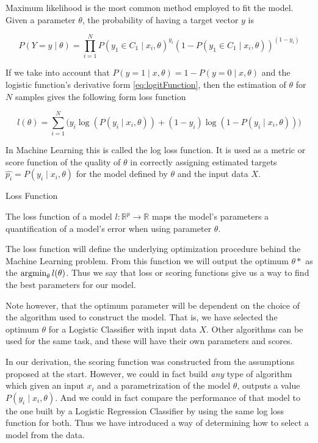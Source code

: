 Maximum likelihood is the most common method employed to fit the model. %
Given a parameter $\theta$, the probability of having a target vector $y$ is

\begin{equation}
P(Y =y \mid \theta ) = \prod_{i=1}^N {P(y_1 \in C_1 \mid x_i, \theta)}^{y_i} {(1 - P(y_1 \in C_1 \mid x_i, \theta) )}^{(1-y_i)}
\end{equation}

If we take into account that $P(y=1 \mid x,\theta) = 1 - P(y=0 \mid x,\theta)$ and the logistic function's derivative form \cref{eq:logitFunction}, then the estimation of $\theta$ for $N$ samples gives the following form
loss function

\begin{equation}\label{eq:logLossFunction}
l(\theta) = \sum_{i=1}^N \big(y_i \log(P(y_i \mid x_i,\theta)) + (1-y_i)\log(1 - P(y_i \mid x_i,\theta) ) \big)
\end{equation}

In Machine Learning this is called the log loss function. It is used as a metric or score function of the quality of $\theta$ in correctly assigning estimated targets $ {\hat{p_i}} = P(y_i \mid x_i,\theta)$ for the model defined by $\theta$ and the input data $X$.

\begin{definition}{Loss Function}

The loss function of a model $l: \mathbb{R}^{ p} \rightarrow  \mathbb{R} $ maps the model's parameters a quantification of a model's error when using parameter $\theta$.
\end{definition}

The loss function will define the underlying optimization procedure behind the Machine Learning problem. From this function we will output the optimum $\theta*$ as the $\operatorname*{argmin}_{\theta} l(\theta) $. Thus we say that loss or scoring functions give us a way to find the best parameters for our model.

Note however, that the optimum parameter will be dependent on the choice of the algorithm used to construct the model. That is, we have selected the optimum $\theta$ for a Logistic Classifier with input data $X$. Other algorithms can be used for the same task, and these will have their own parameters and scores.

In our derivation, the scoring function was constructed from the assumptions proposed at the start. However, we could in fact build \textit{any} type of algorithm which given an input $x_i$ and a parametrization of the model $\theta$, outputs a value $P(y_i \mid x_i,\theta)$. And we could in fact compare the performance of that model to the one built by a Logistic Regression Classifier by using the same log loss function for both. Thus we have introduced a way of determining how to select a model from the data.

